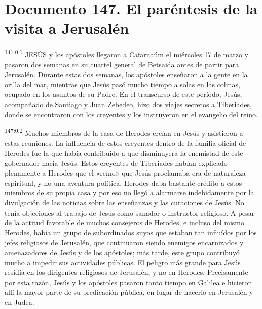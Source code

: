 \chapter{Documento 147. El paréntesis de la visita a Jerusalén}
\par
\textsuperscript{147:0.1} JESÚS y los apóstoles llegaron a Cafarnaúm el miércoles 17 de marzo y pasaron dos semanas en su cuartel general de Betsaida antes de partir para Jerusalén. Durante estas dos semanas, los apóstoles enseñaron a la gente en la orilla del mar, mientras que Jesús pasó mucho tiempo a solas en las colinas, ocupado en los asuntos de su Padre. En el transcurso de este período, Jesús, acompañado de Santiago y Juan Zebedeo, hizo dos viajes secretos a Tiberiades, donde se encontraron con los creyentes y los instruyeron en el evangelio del reino.

\par
\textsuperscript{147:0.2} Muchos miembros de la casa de Herodes creían en Jesús y asistieron a estas reuniones. La influencia de estos creyentes dentro de la familia oficial de Herodes fue la que había contribuido a que disminuyera la enemistad de este gobernador hacia Jesús. Estos creyentes de Tiberiades habían explicado plenamente a Herodes que el «reino» que Jesús proclamaba era de naturaleza espiritual, y no una aventura política. Herodes daba bastante crédito a estos miembros de su propia casa y por eso no llegó a alarmarse indebidamente por la divulgación de las noticias sobre las enseñanzas y las curaciones de Jesús. No tenía objeciones al trabajo de Jesús como sanador o instructor religioso. A pesar de la actitud favorable de muchos consejeros de Herodes, e incluso del mismo Herodes, había un grupo de subordinados suyos que estaban tan influídos por los jefes religiosos de Jerusalén, que continuaron siendo enemigos encarnizados y amenazadores de Jesús y de los apóstoles; más tarde, este grupo contribuyó mucho a impedir sus actividades públicas. El peligro más grande para Jesús residía en los dirigentes religiosos de Jerusalén, y no en Herodes. Precisamente por esta razón, Jesús y los apóstoles pasaron tanto tiempo en Galilea e hicieron allí la mayor parte de su predicación pública, en lugar de hacerlo en Jerusalén y en Judea.

